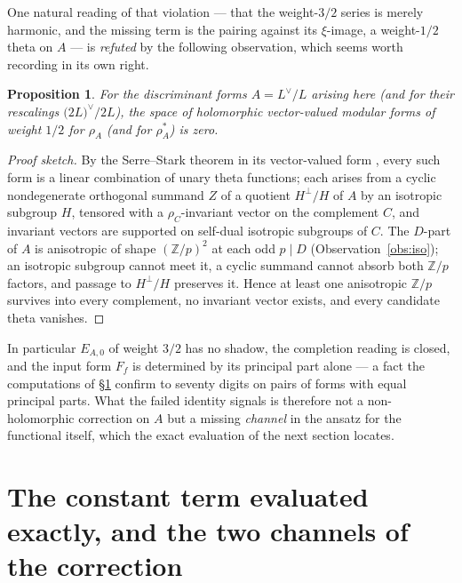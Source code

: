 \documentclass[11pt,reqno]{amsart}
\theoremstyle{plain}
\newtheorem{proposition}[theorem]{Proposition}
\theoremstyle{definition}
\newcommand{\Z}{\mathbb{Z}}
\newcommand{\Ldual}{L^{\vee}}
\begin{document}
One natural reading of that violation --- that the weight-$3/2$ series is merely harmonic, and
the missing term is the pairing against its $\xi$-image, a weight-$1/2$ theta on $A$ --- is
\emph{refuted} by the following observation, which seems worth recording in its own right.

\begin{proposition}\label{prop:nohalf}
For the discriminant forms $A=\Ldual/L$ arising here (and for their rescalings
$\bigl(2L\bigr)^{\vee}\!/2L$), the space of holomorphic vector-valued modular forms of weight
$1/2$ for $\rho_A$ (and for $\rho_A^*$) is zero.
\end{proposition}

\begin{proof}[Proof sketch]
By the Serre--Stark theorem in its vector-valued form \cite{SeSt,Skoruppa}, every such form is a
linear combination of unary theta functions; each arises from a cyclic nondegenerate orthogonal
summand $Z$ of a quotient $H^{\perp}/H$ of $A$ by an isotropic subgroup $H$, tensored with a
$\rho_C$-invariant vector on the complement $C$, and invariant vectors are supported on
self-dual isotropic subgroups of $C$. The $D$-part of $A$ is anisotropic of shape
$(\Z/p)^2$ at each odd $p\mid D$ (Observation~\ref{obs:iso}); an isotropic subgroup cannot meet
it, a cyclic summand cannot absorb both $\Z/p$ factors, and passage to $H^{\perp}/H$ preserves
it. Hence at least one anisotropic $\Z/p$ survives into every complement, no invariant vector
exists, and every candidate theta vanishes.
\end{proof}

In particular $E_{A,0}$ of weight $3/2$ has no shadow, the completion reading is closed, and the
input form $F_f$ is determined by its principal part alone --- a fact the computations of
\S\ref{sec:exact} confirm to seventy digits on pairs of forms with equal principal parts. What
the failed identity signals is therefore not a non-holomorphic correction on $A$ but a missing
\emph{channel} in the ansatz for the functional itself, which the exact evaluation of the next
section locates.

\section{The constant term evaluated exactly, and the two channels of the correction}
\label{sec:exact}
\end{document}
